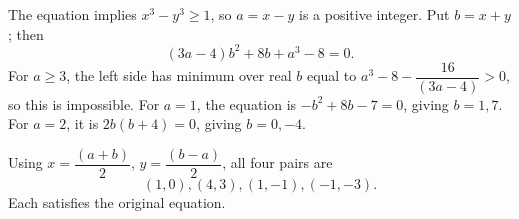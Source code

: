 The equation implies $x^3-y^3\ge1$, so $a=x-y$ is a positive integer. Put $b=x+y$; then
\[
(3a-4)b^2+8b+a^3-8=0.
\]
For $a\ge3$, the left side has minimum over real $b$ equal to $a^3-8-\dfrac{16}{(3a-4)}>0$, so this is impossible. For $a=1$, the equation is $-b^2+8b-7=0$, giving $b=1,7$. For $a=2$, it is $2b(b+4)=0$, giving $b=0,-4$.

Using $x=\dfrac{(a+b)}{2}$, $y=\dfrac{(b-a)}{2}$, all four pairs are
\[
\boxed{(1,0),(4,3),(1,-1),(-1,-3)}.
\]
Each satisfies the original equation.
